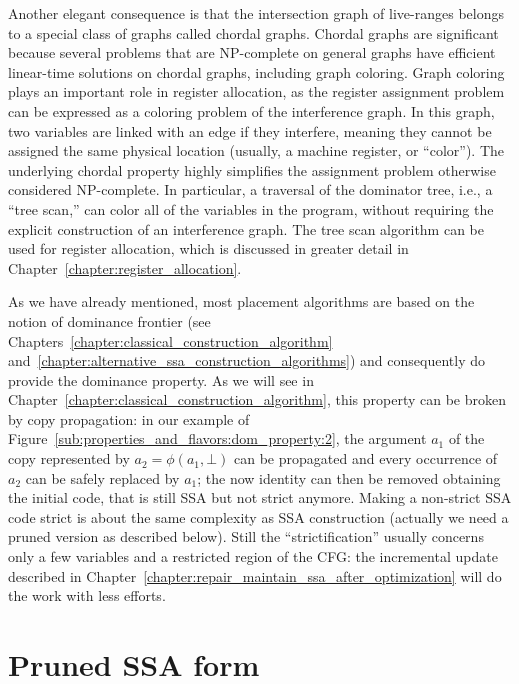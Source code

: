 Another elegant consequence is that the intersection graph of live-ranges belongs to a special class of graphs called chordal graphs. 
Chordal graphs are significant because several problems that are NP-complete on general graphs have efficient linear-time solutions on chordal graphs, including graph coloring. 
Graph coloring plays an important role in register allocation, as the register assignment problem can be expressed as a coloring problem of the interference graph. 
In this graph, two variables are linked with an edge if they interfere, meaning they cannot be assigned the same physical location (usually, a machine register, or ``color''). 
The underlying chordal property highly simplifies the assignment problem otherwise considered NP-complete. 
In particular, a traversal of the dominator tree, i.e., a ``tree scan,'' can color all of the variables in the program, without requiring the explicit construction of an interference graph. 
The tree scan algorithm can be used for register allocation\ifregin, which is discussed in greater detail in Chapter~\ref{chapter:register_allocation}\fi.

As we have already mentioned, most \phifun placement algorithms are based on the notion of dominance frontier (see Chapters~\ref{chapter:classical_construction_algorithm} and~\ref{chapter:alternative_ssa_construction_algorithms}) and consequently do provide the dominance property. 
As we will see in Chapter~\ref{chapter:classical_construction_algorithm}, this property can be broken by copy propagation:  in our example of Figure~\ref{sub:properties_and_flavors:dom_property:2}, the argument $a_1$ of the copy represented by $a_2=\phi(a_1,\bot)$ can be propagated and every occurrence of $a_2$ can be safely replaced by $a_1$; 
the now identity \phifun can then be removed obtaining the initial code, that is still SSA but not strict anymore. 
Making a non-strict SSA code strict is about the same complexity as SSA construction (actually we need a pruned version as described below). 
Still the ``strictification'' usually concerns only a few variables and a restricted region of the CFG:  the incremental update described in Chapter~\ref{chapter:repair_maintain_ssa_after_optimization} will do the work with less efforts.

\section{Pruned SSA form}
\label{sec-prop-pruned}

